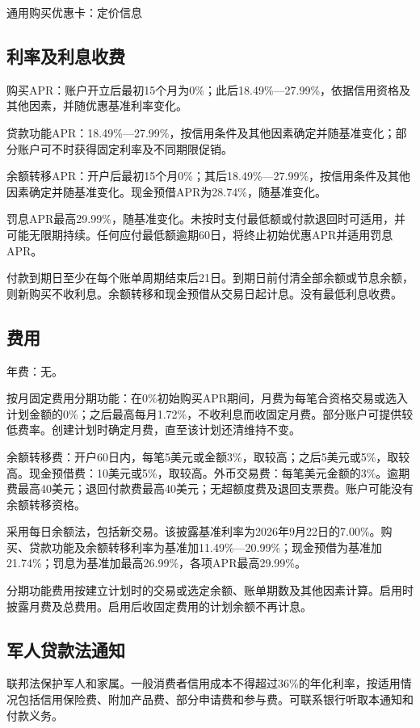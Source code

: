 \documentclass[UTF8,fontset=none,11pt,a4paper]{ctexart}
\begin{document}
通用购买优惠卡：定价信息


\subsection*{利率及利息收费}
购买APR：账户开立后最初15个月为0\%；此后18.49\%—27.99\%，依据信用资格及其他因素，并随优惠基准利率变化。


贷款功能APR：18.49\%—27.99\%，按信用条件及其他因素确定并随基准变化；部分账户可不时获得固定利率及不同期限促销。


余额转移APR：开户后最初15个月0\%；其后18.49\%—27.99\%，按信用条件及其他因素确定并随基准变化。现金预借APR为28.74\%，随基准变化。


罚息APR最高29.99\%，随基准变化。未按时支付最低额或付款退回时可适用，并可能无限期持续。任何应付最低额逾期60日，将终止初始优惠APR并适用罚息APR。


付款到期日至少在每个账单周期结束后21日。到期日前付清全部余额或节息余额，则新购买不收利息。余额转移和现金预借从交易日起计息。没有最低利息收费。


\subsection*{费用}
年费：无。


按月固定费用分期功能：在0\%初始购买APR期间，月费为每笔合资格交易或选入计划金额的0\%；之后最高每月1.72\%，不收利息而收固定月费。部分账户可提供较低费率。创建计划时确定月费，直至该计划还清维持不变。


余额转移费：开户60日内，每笔5美元或金额3\%，取较高；之后5美元或5\%，取较高。现金预借费：10美元或5\%，取较高。外币交易费：每笔美元金额的3\%。逾期费最高40美元；退回付款费最高40美元；无超额度费及退回支票费。账户可能没有余额转移资格。


采用每日余额法，包括新交易。该披露基准利率为2026年9月22日的7.00\%。购买、贷款功能及余额转移利率为基准加11.49\%—20.99\%；现金预借为基准加21.74\%；罚息为基准加最高26.99\%，各项APR最高29.99\%。


分期功能费用按建立计划时的交易或选定余额、账单期数及其他因素计算。启用时披露月费及总费用。启用后收固定费用的计划余额不再计息。


\subsection*{军人贷款法通知}
联邦法保护军人和家属。一般消费者信用成本不得超过36\%的年化利率，按适用情况包括信用保险费、附加产品费、部分申请费和参与费。可联系银行听取本通知和付款义务。
\end{document}
